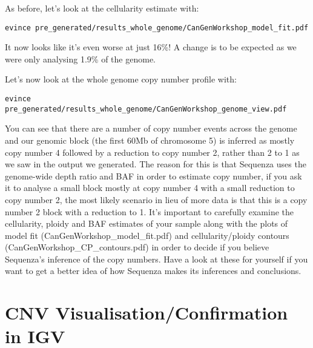 \begin{steps}
As before, let's look at the cellularity estimate with:
\begin{lstlisting}
evince pre_generated/results_whole_genome/CanGenWorkshop_model_fit.pdf
\end{lstlisting}
\end{steps}

It now looks like it's even worse at just 16\%! A change is to be expected as we were only analysing 1.9\% of the genome.\\

\begin{steps}
Let's now look at the whole genome copy number profile with:
\begin{lstlisting}
evince pre_generated/results_whole_genome/CanGenWorkshop_genome_view.pdf
\end{lstlisting}
\end{steps}

You can see that there are a number of copy number events across the genome and our genomic block (the first 60Mb of chromosome 5) is inferred as mostly copy number 4 followed by a reduction to copy number 2, rather than 2 to 1 as we saw in the output we generated. The reason for this is that Sequenza uses the genome-wide depth ratio and BAF in order to estimate copy number, if you ask it to analyse a small block mostly at copy number 4 with a small reduction to copy number 2, the most likely scenario in lieu of more data is that this is a copy number 2 block with a reduction to 1. It's important to carefully examine the cellularity, ploidy and BAF estimates of your sample along with the plots of model fit (CanGenWorkshop\_model\_fit.pdf) and cellularity/ploidy contours (CanGenWorkshop\_CP\_contours.pdf) in order to decide if you believe Sequenza's inference of the copy numbers. Have a look at these for yourself if you want to get a better idea of how Sequenza makes its inferences and conclusions.


\newpage


\section{CNV Visualisation/Confirmation in IGV}

